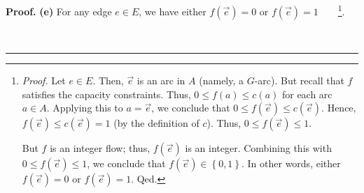 \documentclass[numbers=enddot,12pt,final,onecolumn,notitlepage]{scrartcl}%
\theoremstyle{definition}
\newenvironment{proof}[1][Proof]{\noindent\textbf{#1.} }{\ \rule{0.5em}{0.5em}}
\begin{document}
\begin{proof}
\textbf{(e)} For any edge $e\in E$, we have either $f\left(
\overrightarrow{e}\right)  =0$ or $f\left(  \overrightarrow{e}\right)
=1$\ \ \ \ \footnote{\textit{Proof.} Let $e\in E$. Then, $\overrightarrow{e}$
is an arc in $A$ (namely, a $G$-arc). But recall that $f$ satisfies the
capacity constraints. Thus, $0\leq f\left(  a\right)  \leq c\left(  a\right)
$ for each arc $a\in A$. Applying this to $a=\overrightarrow{e}$, we conclude
that $0\leq f\left(  \overrightarrow{e}\right)  \leq c\left(
\overrightarrow{e}\right)  $. Hence, $f\left(  \overrightarrow{e}\right)  \leq
c\left(  \overrightarrow{e}\right)  =1$ (by the definition of $c$). Thus,
$0\leq f\left(  \overrightarrow{e}\right)  \leq1$.
\par
But $f$ is an integer flow; thus, $f\left(  \overrightarrow{e}\right)  $ is an
integer. Combining this with $0\leq f\left(  \overrightarrow{e}\right)  \leq
1$, we conclude that $f\left(  \overrightarrow{e}\right)  \in\left\{
0,1\right\}  $. In other words, either $f\left(  \overrightarrow{e}\right)
=0$ or $f\left(  \overrightarrow{e}\right)  =1$. Qed.}.


\end{proof}
\end{document}
